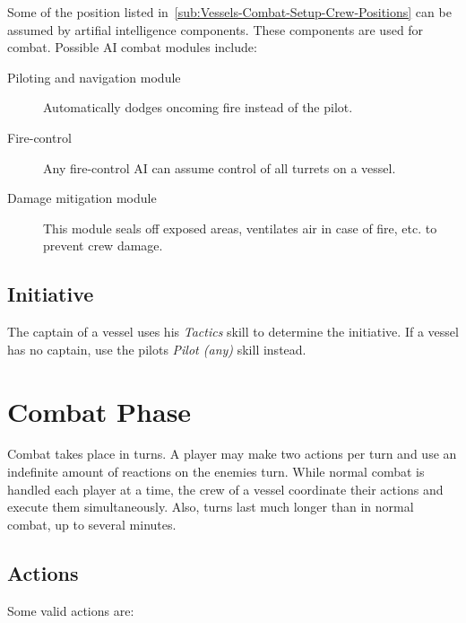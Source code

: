 Some of the position listed in~\ref{sub:Vessels-Combat-Setup-Crew-Positions} can be assumed by artifial intelligence components. These components are used for combat. Possible AI combat modules include:

\begin{description}
  \item[Piloting and navigation module]
  Automatically dodges oncoming fire instead of the pilot.
  \item[Fire-control]
  Any fire-control AI can assume control of all turrets on a vessel.
  \item[Damage mitigation module] This module seals off exposed areas, ventilates air in case of fire, etc. to prevent crew damage.
\end{description}

\subsection{Initiative}
\label{sub:Vessels-Combat-Setup-Initiative}

The captain of a vessel uses his \emph{Tactics} skill to determine the initiative. If a vessel has no captain, use the pilots \emph{Pilot (any)} skill instead.

\section{Combat Phase}
\label{sec:Vessels-Combat-Combat-Phase}

Combat takes place in turns. A player may make two actions per turn and use an indefinite amount of reactions on the enemies turn. While normal combat is handled each player at a time, the crew of a vessel coordinate their actions and execute them simultaneously. Also, turns last much longer than in normal combat, up to several minutes.

\subsection{Actions}
\label{sub:Actions}

Some valid actions are:

